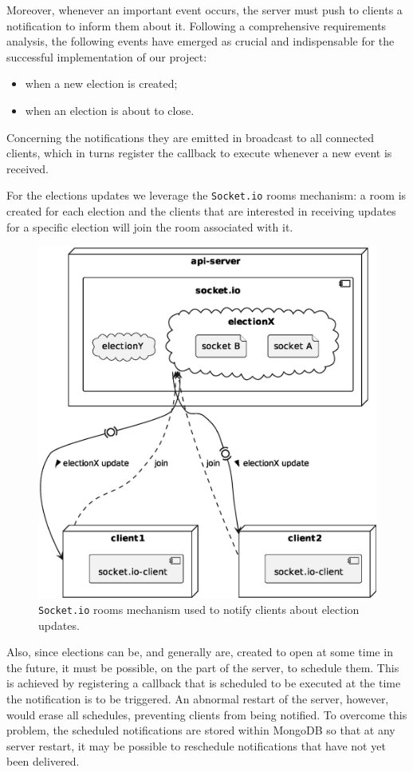 \documentclass{scrartcl}
\begin{document}
Moreover, whenever an important event occurs, the server must push to clients a notification to inform them about it.
%
Following a comprehensive requirements analysis, the following events have emerged as crucial and indispensable for the successful implementation of our project:

\begin{itemize}
    \item when a new election is created;
    \item when an election is about to close.
\end{itemize}


Concerning the notifications they are emitted in broadcast to all connected clients, which in turns register the callback to execute whenever a new event is received.


For the elections updates we leverage the \texttt{Socket.io} rooms mechanism: a room is created for each election and the clients that are interested in receiving updates for a specific election will join the room associated with it.

\begin{figure}
    \centering
    \includegraphics[width=0.7\linewidth]{figures/socket-io-rooms.eps}
    \caption{\texttt{Socket.io} rooms mechanism used to notify clients about election updates.}
    \label{fig:socket-io-rooms} 
\end{figure}

Also, since elections can be, and generally are, created to open at some time in the future, it must be possible, on the part of the server, to schedule them. 
%
This is achieved by registering a callback that is scheduled to be executed at the time the notification is to be triggered. 
%
An abnormal restart of the server, however, would erase all schedules, preventing clients from being notified. 
%
To overcome this problem, the scheduled notifications are stored within MongoDB so that at any server restart, it may be possible to reschedule notifications that have not yet been delivered.
\end{document}
